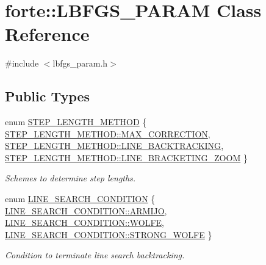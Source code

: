 \hypertarget{classforte_1_1_l_b_f_g_s___p_a_r_a_m}{}\section{forte\+:\+:L\+B\+F\+G\+S\+\_\+\+P\+A\+R\+AM Class Reference}
\label{classforte_1_1_l_b_f_g_s___p_a_r_a_m}


{\ttfamily \#include $<$lbfgs\+\_\+param.\+h$>$}

\subsection*{Public Types}
\begin{DoxyCompactItemize}
\item 
enum \mbox{\hyperlink{classforte_1_1_l_b_f_g_s___p_a_r_a_m_a2651cd29e6c97352a8b72df089d97cfa}{S\+T\+E\+P\+\_\+\+L\+E\+N\+G\+T\+H\+\_\+\+M\+E\+T\+H\+OD}} \{ \mbox{\hyperlink{classforte_1_1_l_b_f_g_s___p_a_r_a_m_a2651cd29e6c97352a8b72df089d97cfaa8a6708ac2b09ab567f08a166a52a5ce1}{S\+T\+E\+P\+\_\+\+L\+E\+N\+G\+T\+H\+\_\+\+M\+E\+T\+H\+O\+D\+::\+M\+A\+X\+\_\+\+C\+O\+R\+R\+E\+C\+T\+I\+ON}}, 
\mbox{\hyperlink{classforte_1_1_l_b_f_g_s___p_a_r_a_m_a2651cd29e6c97352a8b72df089d97cfaa14c2c93ba687e96ccc6256162aad5eeb}{S\+T\+E\+P\+\_\+\+L\+E\+N\+G\+T\+H\+\_\+\+M\+E\+T\+H\+O\+D\+::\+L\+I\+N\+E\+\_\+\+B\+A\+C\+K\+T\+R\+A\+C\+K\+I\+NG}}, 
\mbox{\hyperlink{classforte_1_1_l_b_f_g_s___p_a_r_a_m_a2651cd29e6c97352a8b72df089d97cfaac06ac8233c6dcaffb114f6c6a537e58d}{S\+T\+E\+P\+\_\+\+L\+E\+N\+G\+T\+H\+\_\+\+M\+E\+T\+H\+O\+D\+::\+L\+I\+N\+E\+\_\+\+B\+R\+A\+C\+K\+E\+T\+I\+N\+G\+\_\+\+Z\+O\+OM}}
 \}
\begin{DoxyCompactList}\small\item\em Schemes to determine step lengths. \end{DoxyCompactList}\item 
enum \mbox{\hyperlink{classforte_1_1_l_b_f_g_s___p_a_r_a_m_a363135a6d4f1aa7a5f37a1b5f2a53cc3}{L\+I\+N\+E\+\_\+\+S\+E\+A\+R\+C\+H\+\_\+\+C\+O\+N\+D\+I\+T\+I\+ON}} \{ \mbox{\hyperlink{classforte_1_1_l_b_f_g_s___p_a_r_a_m_a363135a6d4f1aa7a5f37a1b5f2a53cc3a5fd7e4932940fa185613827c61c7949c}{L\+I\+N\+E\+\_\+\+S\+E\+A\+R\+C\+H\+\_\+\+C\+O\+N\+D\+I\+T\+I\+O\+N\+::\+A\+R\+M\+I\+JO}}, 
\mbox{\hyperlink{classforte_1_1_l_b_f_g_s___p_a_r_a_m_a363135a6d4f1aa7a5f37a1b5f2a53cc3ae19ed819ed6243cb715f5e5cb5805fb0}{L\+I\+N\+E\+\_\+\+S\+E\+A\+R\+C\+H\+\_\+\+C\+O\+N\+D\+I\+T\+I\+O\+N\+::\+W\+O\+L\+FE}}, 
\mbox{\hyperlink{classforte_1_1_l_b_f_g_s___p_a_r_a_m_a363135a6d4f1aa7a5f37a1b5f2a53cc3acc463f663dcd166f17450eea5f4abef9}{L\+I\+N\+E\+\_\+\+S\+E\+A\+R\+C\+H\+\_\+\+C\+O\+N\+D\+I\+T\+I\+O\+N\+::\+S\+T\+R\+O\+N\+G\+\_\+\+W\+O\+L\+FE}}
 \}
\begin{DoxyCompactList}\small\item\em Condition to terminate line search backtracking. \end{DoxyCompactList}\end{DoxyCompactItemize}
